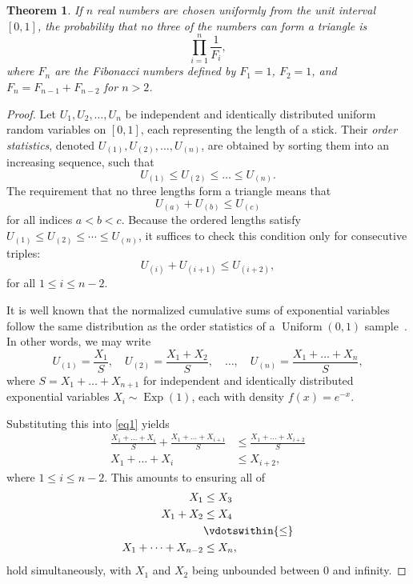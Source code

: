 \documentclass{amsart}
\newtheorem{theorem}{Theorem}
\begin{document}
\begin{theorem}\label{thm1}
  If \(n\) real numbers are chosen uniformly from the unit interval \([0, 1]\), the probability that no three of the numbers can form a triangle is \[
    \prod_{i = 1}^{n} \frac{1}{F_i}
  ,\] where \(F_n\) are the Fibonacci numbers defined by \(F_1 = 1\), \(F_2 = 1\), and \(F_{n} = F_{n-1} + F_{n-2}\) for \(n > 2\).
\end{theorem}
\begin{proof}
  Let $U_1, U_2, \dots, U_n$ be independent and identically distributed uniform random variables on $[0, 1]$, each representing the length of a stick. Their \emph{order statistics}, denoted $U_{(1)}, U_{(2)}, \dots, U_{(n)}$, are obtained by sorting them into an increasing sequence, such that \[
    U_{(1)} \le U_{(2)} \le \dots \le U_{(n)}
  .\] 
  The requirement that no three lengths form a triangle means that
  \[
    U_{(a)} + U_{(b)} \le U_{(c)}
  \]
  for all indices $a < b < c$. Because the ordered lengths satisfy $U_{(1)} \le U_{(2)} \le \cdots \le U_{(n)}$, it suffices to check this condition only for consecutive triples:
  \begin{equation}\label{eq1}
    U_{(i)} + U_{(i+1)} \le U_{(i+2)},
  \end{equation}
  for all $1 \le i \le n-2$.

  It is well known that the normalized cumulative sums of exponential variables follow the same distribution as the order statistics of a $\operatorname{Uniform}(0, 1)$ sample~\cite{johnson}. In other words, we may write \[
    U_{(1)} = \frac{X_1}{S}, \quad U_{(2)} = \frac{X_1 + X_2}{S}, \quad \dots , \quad U_{(n)} = \frac{X_1 + \dots + X_n}{S},
  \] where $S = X_1 + \dots + X_{n+1}$ for independent and identically distributed exponential variables $X_i \sim \operatorname{Exp}(1)$, each with density $f(x) = e^{-x}$.

  Substituting this into \eqref{eq1} yields 
  \begin{align*}
    \frac{X_1 + \dots + X_i}{S} + \frac{X_1 + \dots + X_{i+1}}{S} &\le \frac{X_1 + \dots + X_{i+2}}{S} \\
    X_1 + \dots + X_{i} &\le X_{i+2},
  \end{align*}
  where $1\le i\le n-2$. This amounts to ensuring all of 
  \begin{align*}
    X_1 &\le X_3 \\
    X_1 + X_2 &\le X_4 \\
              &\vdotswithin{\le} \\
    X_1 + \dots + X_{n-2} &\le X_n,
  \end{align*}
  hold simultaneously, with $X_1$ and $X_2$ being unbounded between $0$ and infinity. 


\end{proof}
\end{document}
